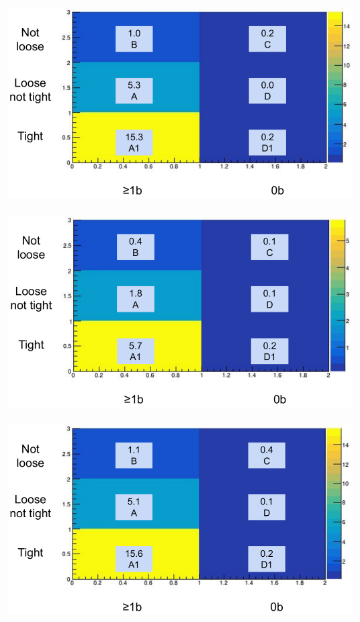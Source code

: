 \begin{figure}[hbt!]
	\centering
	\graphicspath{{figs/chapter5/closuretest/}}
	\begin{subfigure}{.48\textwidth}
		\centering
		\includegraphics[width=\linewidth,height=\textheight,keepaspectratio]{samplei.png}
		\caption{}
		\label{fig:abcd:implementation:closuretests:testi:samplei}
	\end{subfigure}\hspace{0.3cm}
	\begin{subfigure}{.48\textwidth}
		\centering
		\includegraphics[width=\linewidth,height=\textheight,keepaspectratio]{sampleii.png}
		\caption{}
		\label{fig:abcd:implementation:closuretests:testi:sampleii}
	\end{subfigure}
	\begin{subfigure}{.48\textwidth}
		\centering
		\includegraphics[width=\linewidth,height=\textheight,keepaspectratio]{sampleiii.png}

\end{subfigure}
\end{figure}
